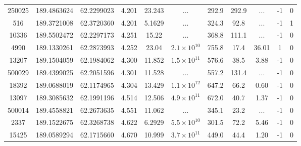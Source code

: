 \begin{table}
\begin{tabular}{ccccccccccc}
     250025 &                  189.4863624 &                 62.2299023 &          4.201 &           23.243 &                ... &          292.9 &       292.9 &         ... &               -1 &                  0 \\
        516 &                  189.3721008 &                 62.3720360 &          4.201 &           5.1629 &                ... &          324.3 &        92.8 &         ... &               -1 &                  1 \\
      10336 &                  189.5502472 &                 62.2297173 &          4.251 &            15.22 &                ... &          368.8 &       111.1 &         ... &               -1 &                  0 \\
       4990 &                  189.1330261 &                 62.2873993 &          4.252 &            23.04 & $2.1\times10^{10}$ &          755.8 &        17.4 &       36.01 &                1 &                  0 \\
      13207 &                  189.1504059 &                 62.1984062 &          4.300 &           11.852 & $1.5\times10^{11}$ &          576.6 &        38.5 &        3.88 &               -1 &                  0 \\
     500029 &                  189.4399025 &                 62.2051596 &          4.301 &           11.528 &                ... &          557.2 &       131.4 &         ... &               -1 &                  0 \\
      18392 &                  189.0688019 &                 62.1174965 &          4.304 &           13.429 & $1.1\times10^{12}$ &          647.2 &        66.2 &        0.60 &               -1 &                  0 \\
      13097 &                  189.3085632 &                 62.1991196 &          4.514 &           12.506 & $4.9\times10^{11}$ &          672.0 &        40.7 &        1.37 &               -1 &                  0 \\
     500014 &                  189.4558821 &                 62.2673635 &          4.551 &           11.062 &                ... &          345.1 &        23.2 &         ... &               -1 &                  0 \\
       2337 &                  189.1522675 &                 62.3268738 &          4.622 &           6.2929 & $5.5\times10^{10}$ &          301.5 &        72.2 &        5.46 &               -1 &                  0 \\
      15425 &                  189.0589294 &                 62.1715660 &          4.670 &           10.999 & $3.7\times10^{11}$ &          449.0 &        44.4 &        1.20 &               -1 &                  0 \\

\end{tabular}
\end{table}
